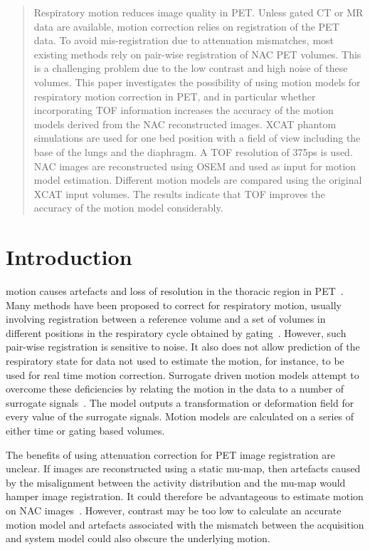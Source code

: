 \documentclass[10pt,twocolumn,twoside,letterpaper]{IEEEtran}
\begin{document}
\begin{abstract}
    Respiratory motion reduces image quality in \gls{PET}. Unless gated \gls{CT} or \gls{MR} data are available, motion correction relies on registration of the \gls{PET} data. To avoid mis-registration due to attenuation mismatches, most existing methods rely on pair-wise registration of \gls{NAC} \gls{PET} volumes. This is a challenging problem due to the low contrast and high noise of these volumes. This paper investigates the possibility of using motion models for respiratory motion correction in \gls{PET}, and in particular whether incorporating \gls{TOF} information increases the accuracy of the motion models derived from the \gls{NAC} reconstructed images. \gls{XCAT} phantom simulations are used for one bed position with a field of view including the base of the lungs and the diaphragm. A \gls{TOF} resolution of 375ps is used. \gls{NAC} images are reconstructed using \gls{OSEM} and used as input for motion model estimation. Different motion models are compared using the original \gls{XCAT} input volumes. The results indicate that \gls{TOF} improves the accuracy of the motion model considerably.
\end{abstract}

\section{Introduction}
 motion causes artefacts and loss of resolution in the thoracic region in \gls{PET}~\cite{Nehmeh2008}. Many methods have been proposed to correct for respiratory motion, usually involving registration between a reference volume and a set of volumes in different positions in the respiratory cycle obtained by gating~\cite{Oliveira2014}. However, such pair-wise registration is sensitive to noise. It also does not allow prediction of the respiratory state for data not used to estimate the motion, for instance, to be used for real time motion correction. Surrogate driven motion models attempt to overcome these deficiencies by relating the motion in the data to a number of surrogate signals~\cite{McClelland2013}. The model outputs a transformation or deformation field for every value of the surrogate signals. Motion models are calculated on a series of either time or gating based volumes.

The benefits of using attenuation correction for \gls{PET} image registration are unclear. If images are reconstructed using a static \gls{mu-map}, then artefacts caused by the misalignment between the activity distribution and the \gls{mu-map} would hamper image registration. It could therefore be advantageous to estimate motion on \gls{NAC} images~\cite{WenjiaBai2011}. However, contrast may be too low to calculate an accurate motion model and artefacts associated with the mismatch between the acquisition and system model could also obscure the underlying motion. 
\end{document}

